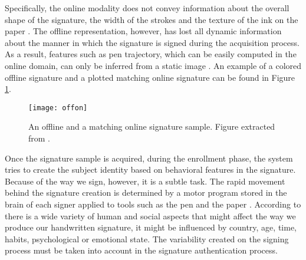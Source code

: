 Specifically, the online modality does not convey information about the overall shape of the signature, the width of the strokes and the texture of the ink on the paper \cite{diaz2014generation}. The offline representation, however, has lost all dynamic information about the manner in which the signature is signed during the acquisition process. As a result, features such as pen trajectory, which can be easily computed in the online domain, can only be inferred from a static image \cite{nel2005estimating}. An example of a colored offline signature and a plotted matching online signature can be found in Figure \ref{fig:offon}. 


\begin{figure}[!htb]
\centering
\texttt{[image: offon]}
\caption{An offline and a matching online signature sample. Figure extracted from \cite{sigcomp2009}.}
\label{fig:offon}
\end{figure}

%

Once the signature sample is acquired, during the enrollment phase, the system tries to create the subject identity based on behavioral features in the signature. Because of the way we sign, however, it is a subtle task. The rapid movement behind the signature creation is determined by a motor program stored in the brain of each signer applied to tools such as the pen and the paper \cite{pirlo2014advances}. According to \cite{plamondon1989automatic} there is a wide variety of human and social aspects that might affect the way we produce our handwritten signature, it might be influenced by country, age, time, habits, psychological or emotional state. The variability created on the signing process must be taken into account in the signature authentication process.

